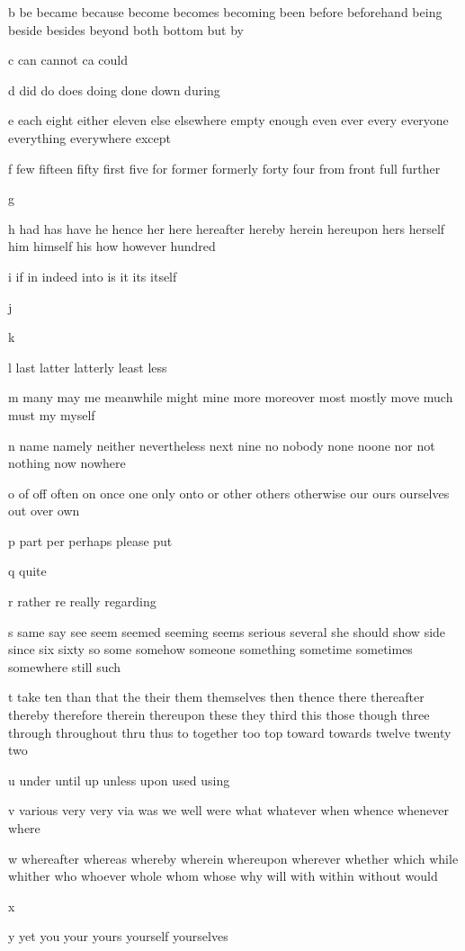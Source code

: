 \documentclass[../embeddings.tex]{subfiles}
\begin{document}
b be became because become becomes becoming been before beforehand
being beside besides beyond both bottom but by

c can cannot ca could

d did do does doing done down during

e each eight either eleven else elsewhere empty enough even ever every
everyone everything everywhere except

f few fifteen fifty first five for former formerly forty four from front full
further

g

h had has have he hence her here hereafter hereby herein hereupon hers herself
him himself his how however hundred

i if in indeed into is it its itself

j

k

l last latter latterly least less

m many may me meanwhile might mine more moreover most mostly move much
must my myself

n name namely neither nevertheless next nine no nobody none noone nor not
nothing now nowhere

o of off often on once one only onto or other others otherwise our ours ourselves
out over own

p part per perhaps please put

q quite

r rather re really regarding

s same say see seem seemed seeming seems serious several she should show side
since six sixty so some somehow someone something sometime sometimes somewhere
still such

t take ten than that the their them themselves then thence there thereafter
thereby therefore therein thereupon these they third this those though three
through throughout thru thus to together too top toward towards twelve twenty
two

u under until up unless upon used using

v various very very via was we well were what whatever when whence whenever where

w whereafter whereas whereby wherein whereupon wherever whether which while
whither who whoever whole whom whose why will with within without would

x

y yet you your yours yourself yourselves
\end{document}
